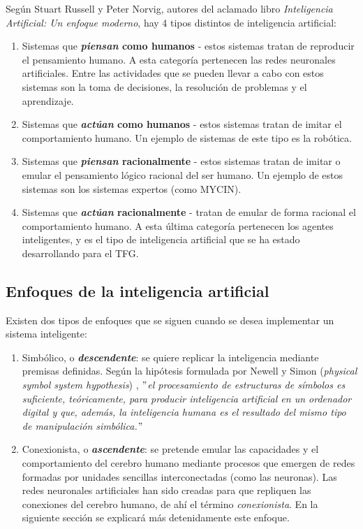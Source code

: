 Según Stuart Russell y Peter Norvig, autores del aclamado libro \textit{Inteligencia Artificial: Un enfoque moderno}, hay 4 tipos distintos de inteligencia artificial:
\begin{enumerate}
    \item Sistemas que \textbf{\textit{piensan} como humanos} - estos sistemas tratan de reproducir el pensamiento humano. A esta categoría pertenecen las redes neuronales artificiales. Entre las actividades que se pueden llevar a cabo con estos sistemas son la toma de decisiones, la resolución de problemas y el aprendizaje.
    \item Sistemas que \textbf{\textit{actúan} como humanos} - estos sistemas tratan de imitar el comportamiento humano. Un ejemplo de sistemas de este tipo es la robótica.
    \item Sistemas que \textbf{\textit{piensan} racionalmente} - estos sistemas tratan de imitar o emular el pensamiento lógico racional del ser humano. Un ejemplo de estos sistemas son los sistemas expertos (como MYCIN).
    \item Sistemas que \textbf{\textit{actúan} racionalmente} - tratan de emular de forma racional el comportamiento humano. A esta última categoría pertenecen los agentes inteligentes, y es el tipo de inteligencia artificial que se ha estado desarrollando para el TFG.
\end{enumerate}

\subsection{Enfoques de la inteligencia artificial}

Existen dos tipos de enfoques que se siguen cuando se desea implementar un sistema inteligente:
\begin{enumerate}
    \item Simbólico, o \textit{\textbf{descendente}}: se quiere replicar la inteligencia mediante premisas definidas. Según la hipótesis formulada por Newell y Simon (\textit{physical symbol system hypothesis}) \cite{nilsson2007physical}, \textit{$"$el procesamiento de estructuras de símbolos es suficiente, teóricamente, para producir inteligencia artificial en un ordenador digital y que, además, la inteligencia humana es el resultado del mismo tipo de manipulación simbólica.$"$}
    \item Conexionista, o \textit{\textbf{ascendente}}: se pretende emular las capacidades y el comportamiento del cerebro humano mediante procesos que emergen de redes formadas por unidades sencillas interconectadas (como las neuronas). Las redes neuronales artificiales han sido creadas para que repliquen las conexiones del cerebro humano, de ahí el término \textit{conexionista}. En la siguiente sección se explicará más detenidamente este enfoque. 
\end{enumerate}

